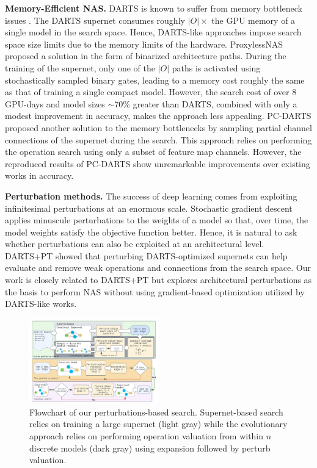 \documentclass[onecolumn]{IEEEtran}
\begin{document}
\textbf{Memory-Efficient NAS.} DARTS \cite{Liu2018} is known to suffer from memory bottleneck issues \cite{Cai2018, Xu2019}. The DARTS supernet consumes roughly \(|O| \times\) the GPU memory of a single model in the search space. Hence, DARTS-like approaches impose search space size limits due to the memory limits of the hardware. ProxylessNAS \cite{Cai2018} proposed a solution in the form of binarized architecture paths. During the training of the supernet, only one of the \(|O|\) paths is activated using stochastically sampled binary gates, leading to a memory cost roughly the same as that of training a single compact model. However, the search cost of over 8 GPU-days and model sizes \(\sim 70\%\) greater than DARTS, combined with only a modest improvement in accuracy, makes the approach less appealing. PC-DARTS \cite{Xu2019} proposed another solution to the memory bottlenecks by sampling partial channel connections of the supernet during the search. This approach relies on performing the operation search using only a subset of feature map channels. However, the reproduced results of PC-DARTS \cite{Xu2019} show unremarkable improvements over existing works in accuracy.

\textbf{Perturbation methods.} The success of deep learning comes from exploiting infinitesimal perturbations at an enormous scale. Stochastic gradient descent applies minuscule perturbations to the weights of a model so that, over time, the model weights satisfy the objective function better. Hence, it is natural to ask whether perturbations can also be exploited at an architectural level. DARTS+PT \cite{Wang2021} showed that perturbing DARTS-optimized supernets can help evaluate and remove weak operations and connections from the search space. Our work is closely related to DARTS+PT but explores architectural perturbations as the basis to perform NAS without using gradient-based optimization utilized by DARTS-like works.

\begin{figure}[ht]
	\centering
	\includegraphics[width=0.5\textwidth]{Figure-2.png}
	\caption{Flowchart of our perturbations-based search. Supernet-based search relies on training a large supernet (light gray) while the evolutionary approach relies on performing operation valuation from within \( n \) discrete models (dark gray) using expansion followed by perturb valuation.}
	\label{fig:flowchart_search}
\end{figure}
\end{document}
